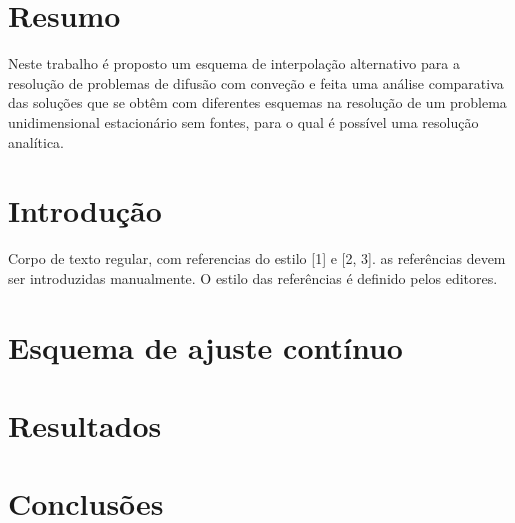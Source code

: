 \documentclass[11pt,twoside]{article}
\begin{document}
{\setlength{\parindent}{30pt}%

\small%
\section*{Resumo}
\smallskip
Neste trabalho é proposto um esquema de interpolação alternativo para a
resolução de problemas de difusão com conveção e feita uma análise
comparativa das soluções que se obtêm com diferentes esquemas na resolução de um
problema unidimensional estacionário sem fontes, para o qual é possível uma
resolução analítica.

\vspace{15pt}





\section{Introdução}
Corpo de texto regular, com referencias do estilo [1] e [2, 3]. as referências devem ser introduzidas manualmente. O estilo das referências é definido pelos editores.

\section{Esquema de ajuste contínuo}
\section{Resultados}


%











\section{Conclusões}

}
\end{document}
